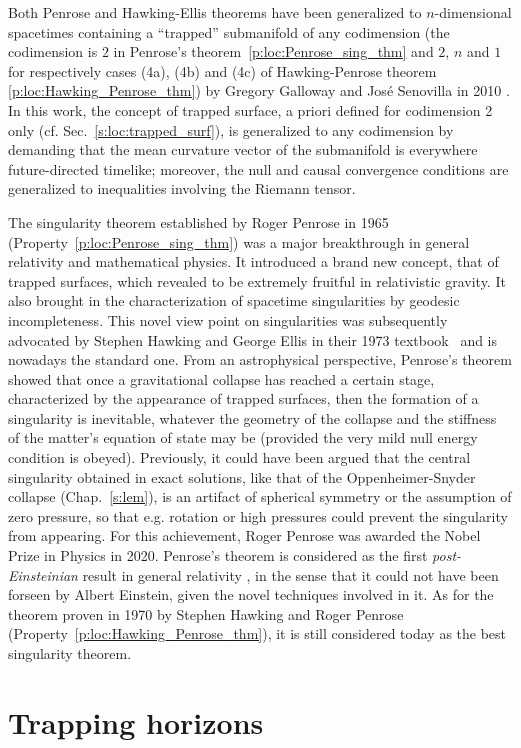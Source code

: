 \begin{remark}
Both Penrose and Hawking-Ellis theorems have been generalized to $n$-dimensional spacetimes containing a ``trapped'' submanifold
of any codimension (the codimension is $2$ in Penrose's theorem~\ref{p:loc:Penrose_sing_thm}
and $2$, $n$ and $1$ for respectively cases (4a), (4b) and (4c) of Hawking-Penrose theorem \ref{p:loc:Hawking_Penrose_thm}) by Gregory Galloway and
José Senovilla in 2010 \cite{GalloS10}.
In this work,
the concept of trapped surface, a priori defined for
codimension 2 only (cf. Sec.~\ref{s:loc:trapped_surf}), is generalized to any codimension
by demanding that the mean curvature vector of the submanifold is everywhere future-directed timelike; moreover, the null and causal convergence conditions
are generalized to inequalities involving the Riemann tensor.
\end{remark}

\begin{hist}
The singularity theorem established by Roger Penrose
in 1965 \cite{Penro65} (Property~\ref{p:loc:Penrose_sing_thm})
was a major breakthrough in general relativity and mathematical physics.
It introduced a brand new concept, that of trapped surfaces, which revealed to
be extremely fruitful in relativistic gravity. It also brought in the characterization of
spacetime singularities by geodesic incompleteness. This novel view point on
singularities was subsequently advocated by Stephen Hawking and George Ellis in their 1973 textbook~\cite{HawkiE73} and is nowadays the standard one. From an astrophysical perspective, Penrose's theorem showed that
once a gravitational collapse has reached a certain stage, characterized by the appearance
of trapped surfaces, then the formation of a singularity is inevitable, whatever the
geometry of the collapse and the stiffness of the matter's equation of state may be (provided
the very mild null energy condition is obeyed). Previously, it could have been
argued that the central singularity obtained in exact solutions, like that
of the Oppenheimer-Snyder collapse (Chap.~\ref{s:lem}), is an artifact of spherical
symmetry or the assumption of zero pressure, so that e.g. rotation or high pressures could
prevent the singularity from appearing. For this achievement, Roger Penrose was awarded the Nobel Prize in Physics in 2020.
Penrose's theorem is considered as the
first \emph{post-Einsteinian} result in general relativity \cite{SenovG15,Senov22a},
in the sense that it could not have been forseen by Albert Einstein,
given the novel techniques involved in it. As for the theorem
proven in 1970 by Stephen Hawking  and
Roger Penrose \cite{HawkiP70} (Property~\ref{p:loc:Hawking_Penrose_thm}),
it is still considered today as the best singularity theorem.
\end{hist}



\section{Trapping horizons}


